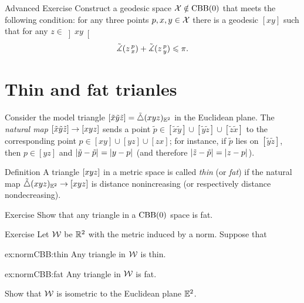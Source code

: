 \begin{thm}{Advanced Exercise}\label{ex:urysohn}
Construct a geodesic space $\mathcal{X}\notin\mathrm{CBB}(0)$ that meets the following condition: for any three points $p,x,y\in \mathcal{X}$ there is a geodesic $[x y]$ such that for any $z\in \left]x y\right[$
\[\tilde\measuredangle(z\,{}^{p}_{x})+\tilde\measuredangle(z\,{}^{p}_{y})
\leqslant
\pi.\]
\end{thm}

\section{Thin and fat trianles}

Consider the  model triangle $\trig{\tilde x}{\tilde y}{\tilde z}\z=\modtrig{}({x}{y}{z})_{\EE^2}$ in the Euclidean plane.
The \emph{natural map} $\trig{\tilde x}{\tilde y}{\tilde z}\z\to \trig{x}{y}{z}$ 
sends a point $\tilde p\in[\tilde x\tilde y]\cup[\tilde y\tilde z]\cup[\tilde z\tilde x]$ to the corresponding point $p\in[ x y]\cup[y z]\cup[ z x]$;
for instance, if $\tilde p$ lies on $[\tilde y\tilde z]$,
then $p\in [y z]$ and $\dist{\tilde y}{\tilde p}{}=\dist{y}{p}{}$ (and therefore $\dist{\tilde z}{\tilde p}{}=\dist{z}{p}{}$).
 
\begin{thm}{Definition}\label{def:k-thin-}
A triangle $[xyz]$ in a metric space
is called \emph{thin} (or \emph{fat}) if the natural map $\tilde\triangle{}({x}{y}{z})_{\mathbb{E}^2}\to [xyz]$ is distance nonincreasing (or respectively distance nondecreasing).

\end{thm}

\begin{thm}{Exercise}\label{ex:fat}
Show that any triangle in a $\mathrm{CBB}(0)$ space is fat.
\end{thm}

\begin{thm}{Exercise}\label{ex:normCBB}
Let $\mathcal{W}$ be $\mathbb{R}^2$ with the metric induced by a norm.
Suppose that 

\begin{subthm}{ex:normCBB:thin}
Any triangle in $\mathcal{W}$ is thin.
\end{subthm}

\begin{subthm}{ex:normCBB:fat}
Any triangle in $\mathcal{W}$ is fat.
\end{subthm}

Show that $\mathcal{W}$ is isometric to the Euclidean plane $\mathbb{E}^2$.
\end{thm}

